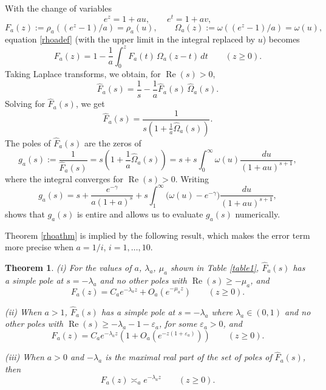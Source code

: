 \documentclass[11pt]{amsart}
\newtheorem{theorem}{Theorem}
\DeclareMathOperator{\re}{Re}
\begin{document}
With the change of variables 
$$e^z=1+au,  \qquad e^t=1+av,$$ 
$$F_a(z):=\rho_a((e^z-1)/a)=\rho_a(u), \qquad \Omega_a(z):=\omega((e^z-1)/a) =\omega(u),$$ 
equation \eqref{rhoadef} (with the upper limit in the integral replaced by $u$) becomes
 \begin{equation}\label{FaDef}
 F_a(z) =  1 - \frac{1}{a} \int_{0}^{z} F_a(t)  \, \Omega_a(z-t) \, dt \qquad (z\ge 0).
 \end{equation}
Taking Laplace transforms, we obtain, for $\re(s)>0$, 
$$
\widehat{F}_a(s) = \frac{1}{s} - \frac{1}{a} \widehat{F}_a(s)\,  \widehat{\Omega}_a(s).
$$
Solving for $\widehat{F}_a(s) $, we get
\begin{equation}\label{FaLap}
\widehat{F}_a(s) =  \frac{1}{s(1+\frac{1}{a} \widehat{\Omega}_a(s)) } .
\end{equation}
The poles of $\widehat{F}_a(s)$ are the zeros of
$$
g_a(s) := \frac{1}{\widehat{F}_a(s)} =  s(1+\frac{1}{a} \widehat{\Omega}_a(s)) =s+s\int_0^\infty \omega(u) \frac{du}{(1+au)^{s+1}},
$$
where the integral converges for $\re(s)>0$. Writing
\begin{equation}\label{eqgaseval}
g_a(s)=s + \frac{e^{-\gamma}}{a (1+a)^s} 
+s \int_1^\infty \bigl( \omega(u) - e^{-\gamma}\bigr)   \frac{du}{(1+au)^{s+1}},
\end{equation}
shows that $g_a(s)$ is entire and allows us to evaluate $g_a(s)$ numerically.


Theorem \ref{rhoathm} is implied by the following result, which makes the error term more precise when $a=1/i$, $i=1,\ldots,10$.

\begin{theorem}\label{thmFara}
(i) For the values of $a$, $\lambda_a$, $\mu_a$ shown in Table \ref{table1}, $\widehat{F}_a(s)$ has a simple pole at $s=-\lambda_a$ and
no other poles with $\re(s)\ge -\mu_a$, and
\begin{equation}\label{rhoasy}
F_a(z)=C_a e^{-\lambda_a z} + O_a\left(e^{-\mu_a z}\right) \qquad (z\ge 0).
\end{equation}

(ii)
When $a>1$,  $\widehat{F}_a(s)$ has a simple pole at $s=-\lambda_a$ where $\lambda_a\in (0,1)$
and no other poles with $\re(s)\ge -\lambda_a -1- \varepsilon_a$, for some $\varepsilon_a>0$, and
$$
F_a(z)=C_a e^{-\lambda_a z} (1+O_a(e^{-z(1+\varepsilon_a)})) \qquad (z\ge 0).
$$

(iii)
 When $a>0$ and  $-\lambda_a$ is the maximal real part of the set of poles of  $\widehat{F}_a(s)$, then
$$
F_a(z) \asymp_a e^{-\lambda_a z}\qquad (z\ge 0).
$$
\end{theorem}
\end{document}
